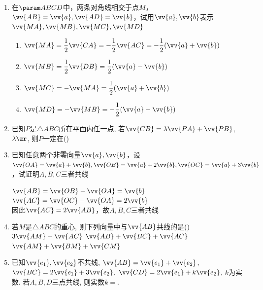 \begin{enumerate}
\begin{jieda}
\begin{enumerate}
        \end{enumerate}
    \end{jieda}
    \item 在$\param ABCD$中，两条对角线相交于点$M$，$\vv{AB} = \vv{a}, \vv{AD} = \vv{b}$，试用$\vv{a}, \vv{b}$表示$\vv{MA}, \vv{MB}, \vv{MC}, \vv{MD}$
    \begin{jieda}
        \begin{enumerate}
            \item $\vv{MA} = \dfrac{1}{2} \vv{CA} = -\dfrac{1}{2} \vv{AC} = -\dfrac{1}{2}(\vv{a} + \vv{b})$
            \item $\vv{MB} = \dfrac{1}{2} \vv{DB} = \dfrac{1}{2} (\vv{a} - \vv{b})$
            \item $\vv{MC} = -\vv{MA} = \dfrac{1}{2}(\vv{a} + \vv{b})$
            \item $\vv{MD} = -\vv{MB} = -\dfrac{1}{2} (\vv{a} - \vv{b})$
        \end{enumerate}
    \end{jieda}
    \item 已知$P$是$\triangle{ABC}$所在平面内任一点, 若$\vv{CB}=\lambda\vv{PA}+\vv{PB}$, $\lambda\zr$, 则$P$一定在\dotfill()
    \item 已知任意两个非零向量$\vv{a}, \vv{b}$，设$\vv{OA} = \vv{a} + \vv{b}, \vv{OB} = \vv{a} + 2\vv{b}, \vv{OC} = \vv{a} + 3\vv{b}$，试证明$A,B,C$三者共线
    \begin{jieda}
        $\vv{AB} = \vv{OB} - \vv{OA} = \vv{b}$ \\
        $\vv{AC} = \vv{OC} - \vv{OA} = 2\vv{b}$ \\
        因此$\vv{AC} = 2 \vv{AB}$，故$A,B,C$三者共线
    \end{jieda} 

    
    \item 若$M$是$\triangle{ABC}$的重心, 则下列向量中与$\vv{AB}$共线的是\dotfill()
    {$3\vv{AM}+\vv{AC}$}
    {$\vv{AB}+\vv{BC}+\vv{AC}$}
    {$\vv{AM}+\vv{BM}+\vv{CM}$}
    
    \item 已知$\vv{e_1},\vv{e_2}$不共线, $\vv{AB}=\vv{e_1}+\vv{e_2}$, $\vv{BC}=2\vv{e_1}+3\vv{e_2}$, $\vv{CD}=2\vv{e_1}+k\vv{e_2}$, $k$为实数. 
    若$A,B,D$三点共线, 则实数$k=$. 


\end{enumerate}
